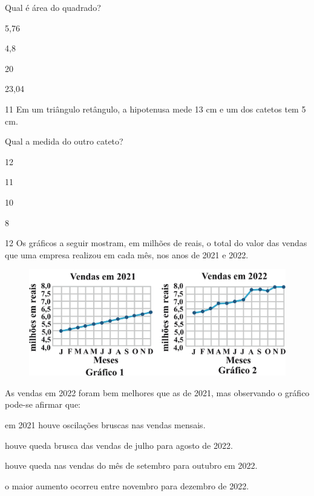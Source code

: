 Qual é área do quadrado?

\begin{escolha}

  \item 5,76

  \item 4,8

  \item 20

  \item 23,04

\end{escolha}


\num{11} Em um triângulo retângulo, a hipotenusa mede 13 cm e um
dos catetos tem 5 cm.

Qual a medida do outro cateto?

\begin{escolha}

  \item 12

  \item 11

  \item 10

  \item 8

\end{escolha}

\pagebreak
\num{12} Os gráficos a seguir mostram, em milhões de reais, o total do
valor das vendas que uma empresa realizou em cada mês, nos anos de 2021
e 2022.

\begin{figure}[htpb!]
\centering
\includegraphics[width=\textwidth]{./ilustras-mat/Simulado_3-atividade_12.png}
\end{figure}

As vendas em 2022 foram bem melhores que as de 2021, mas observando o
gráfico pode-se afirmar que:

\begin{escolha}

  \item em 2021 houve oscilações bruscas nas vendas mensais.

  \item houve queda brusca das vendas de julho para agosto de 2022.

  \item houve queda nas vendas do mês de setembro para outubro em 2022.

  \item o maior aumento ocorreu entre novembro para dezembro de 2022.

\end{escolha}

